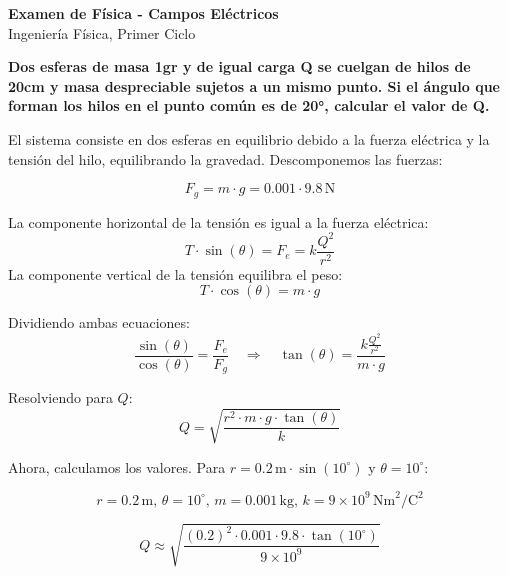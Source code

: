 \documentclass[12pt, answers]{exam} %
\begin{document}
\begin{center}
    \large\textbf{Examen de Física - Campos Eléctricos}\\[1em]
    \large Ingeniería Física, Primer Ciclo\\[1em]
\end{center}

\begin{questions}

    \question \large\textbf{Dos esferas de masa 1gr y de igual carga Q se cuelgan de hilos de 20cm y masa despreciable sujetos a un mismo punto. Si el ángulo que forman los hilos en el punto común es de 20°, calcular el valor de Q.}

    
        El sistema consiste en dos esferas en equilibrio debido a la fuerza eléctrica y la tensión del hilo, equilibrando la gravedad. Descomponemos las fuerzas:
    
        \[
        F_g = m \cdot g = 0.001 \cdot 9.8 \, \text{N}
        \]
    
        La componente horizontal de la tensión es igual a la fuerza eléctrica:
        \[
        T \cdot \sin(\theta) = F_e = k \frac{Q^2}{r^2}
        \]
        La componente vertical de la tensión equilibra el peso:
        \[
        T \cdot \cos(\theta) = m \cdot g
        \]
    
        Dividiendo ambas ecuaciones:
        \[
        \frac{\sin(\theta)}{\cos(\theta)} = \frac{F_e}{F_g} \quad \Rightarrow \quad \tan(\theta) = \frac{k \frac{Q^2}{r^2}}{m \cdot g}
        \]
    
        Resolviendo para $Q$:
        \[
        Q = \sqrt{\frac{r^2 \cdot m \cdot g \cdot \tan(\theta)}{k}}
        \]
    
        Ahora, calculamos los valores. Para $r = 0.2 \, \text{m} \cdot \sin(10^\circ)$ y $\theta = 10^\circ$:
        
        \[
        r = 0.2 \, \text{m}, \, \theta = 10^\circ, \, m = 0.001 \, \text{kg}, \, k = 9 \times 10^9 \, \text{Nm}^2/\text{C}^2
        \]
        
        \[
        Q \approx \sqrt{\frac{(0.2)^2 \cdot 0.001 \cdot 9.8 \cdot \tan(10^\circ)}{9 \times 10^9}}
        \]
  
    
        \vspace{1cm}
        
      \begin{center}
\end{center}
\end{questions}
\end{document}
